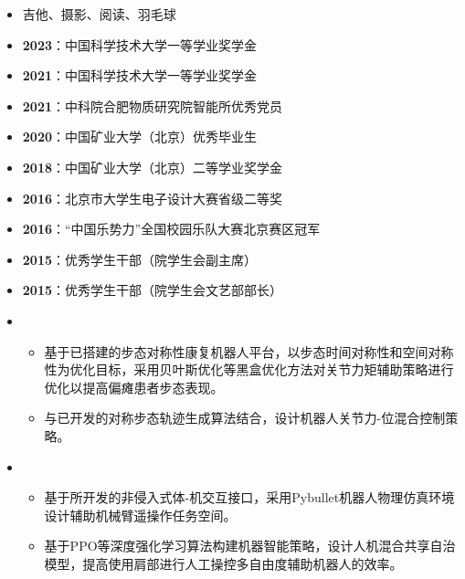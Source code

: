   \begin{itemize}[leftmargin=*]
    \item 吉他、摄影、阅读、羽毛球
    \item \textbf{2023}：中国科学技术大学一等学业奖学金
    \item \textbf{2021}：中国科学技术大学一等学业奖学金
    \item \textbf{2021}：中科院合肥物质研究院智能所优秀党员
    \item \textbf{2020}：中国矿业大学（北京）优秀毕业生
    \item \textbf{2018}：中国矿业大学（北京）二等学业奖学金
    \item \textbf{2016}：北京市大学生电子设计大赛省级二等奖
    \item \textbf{2016}：“中国乐势力”全国校园乐队大赛北京赛区冠军
    \item \textbf{2015}：优秀学生干部（院学生会副主席）
    \item \textbf{2015}：优秀学生干部（院学生会文艺部部长）
  \end{itemize}

\begin{itemize}[leftmargin=*]
  \item {}
  {\small
  \begin{itemize}
    \item 基于已搭建的步态对称性康复机器人平台，以步态时间对称性和空间对称性为优化目标，采用贝叶斯优化等黑盒优化方法对关节力矩辅助策略进行优化以提高偏瘫患者步态表现。
    \item 与已开发的对称步态轨迹生成算法结合，设计机器人关节力-位混合控制策略。
  \end{itemize}
  }
  \item {}
  {\small
  \begin{itemize}
    \item 基于所开发的非侵入式体-机交互接口，采用Pybullet机器人物理仿真环境设计辅助机械臂遥操作任务空间。
    \item 基于PPO等深度强化学习算法构建机器智能策略，设计人机混合共享自治模型，提高使用肩部进行人工操控多自由度辅助机器人的效率。
  \end{itemize}
  }
\end{itemize}